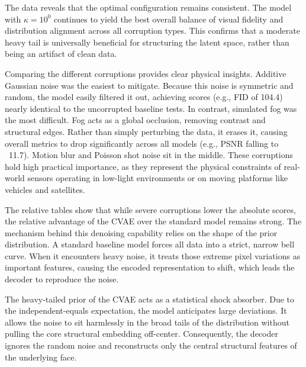 \documentclass[twoside,11pt]{article}
\begin{document}
The data reveals that the optimal configuration remains consistent. The model with $\kappa = 10^0$ continues to yield the best overall balance of visual fidelity and distribution alignment across all corruption types. This confirms that a moderate heavy tail is universally beneficial for structuring the latent space, rather than being an artifact of clean data. 

Comparing the different corruptions provides clear physical insights. Additive Gaussian noise was the easiest to mitigate. Because this noise is symmetric and random, the model easily filtered it out, achieving scores (e.g., FID of 104.4) nearly identical to the uncorrupted baseline tests. In contrast, simulated fog was the most difficult. Fog acts as a global occlusion, removing contrast and structural edges. Rather than simply perturbing the data, it erases it, causing overall metrics to drop significantly across all models (e.g., PSNR falling to ~11.7). Motion blur and Poisson shot noise sit in the middle. These corruptions hold high practical importance, as they represent the physical constraints of real-world sensors operating in low-light environments or on moving platforms like vehicles and satellites.

The relative tables show that while severe corruptions lower the absolute scores, the relative advantage of the CVAE over the standard model remains strong. The mechanism behind this denoising capability relies on the shape of the prior distribution. A standard baseline model forces all data into a strict, narrow bell curve. When it encounters heavy noise, it treats those extreme pixel variations as important features, causing the encoded representation to shift, which leads the decoder to reproduce the noise. 

The heavy-tailed prior of the CVAE acts as a statistical shock absorber. Due to the independent-equals expectation, the model anticipates large deviations. It allows the noise to sit harmlessly in the broad tails of the distribution without pulling the core structural embedding off-center. Consequently, the decoder ignores the random noise and reconstructs only the central structural features of the underlying face.
\end{document}

